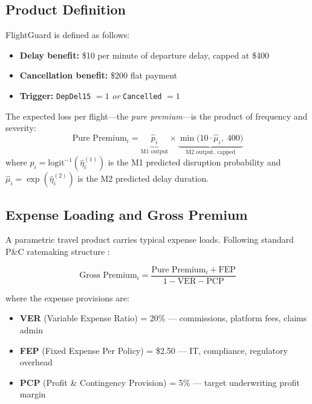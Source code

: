 \documentclass[12pt, a4paper]{article}
\begin{document}
\subsection{Product Definition}

FlightGuard is defined as follows:
\begin{itemize}[itemsep=2pt]
    \item \textbf{Delay benefit:} \$10 per minute of departure delay, capped at \$400
    \item \textbf{Cancellation benefit:} \$200 flat payment
    \item \textbf{Trigger:} \texttt{DepDel15} $= 1$ \textit{or} \texttt{Cancelled} $= 1$
\end{itemize}

\noindent The expected loss per flight---the \textit{pure premium}---is the product of frequency and severity:
\begin{equation}
    \text{Pure Premium}_i = \underbrace{\hat{p}_i}_{\text{M1 output}} \times \underbrace{\min\!\bigl(10 \cdot \hat{\mu}_i,\; 400\bigr)}_{\text{M2 output, capped}}
    \label{eq:pp}
\end{equation}
where $\hat{p}_i = \text{logit}^{-1}(\hat{\eta}_i^{(1)})$ is the M1 predicted disruption probability and $\hat{\mu}_i = \exp(\hat{\eta}_i^{(2)})$ is the M2 predicted delay duration.

\subsection{Expense Loading and Gross Premium}

A parametric travel product carries typical expense loads. Following standard P\&C ratemaking structure \citep{cas2004}:

\begin{equation}
    \text{Gross Premium}_i = \frac{\text{Pure Premium}_i + \text{FEP}}{1 - \text{VER} - \text{PCP}}
    \label{eq:gp}
\end{equation}

\noindent where the expense provisions are:
\begin{itemize}[itemsep=2pt]
    \item \textbf{VER} (Variable Expense Ratio) = 20\% --- commissions, platform fees, claims admin
    \item \textbf{FEP} (Fixed Expense Per Policy) = \$2.50 --- IT, compliance, regulatory overhead
    \item \textbf{PCP} (Profit \& Contingency Provision) = 5\% --- target underwriting profit margin
\end{itemize}
\end{document}
